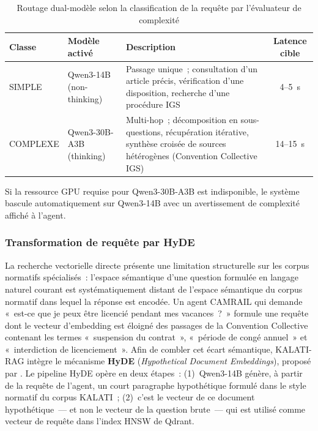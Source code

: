 \documentclass[12pt,a4paper]{report}
\begin{document}
\begin{table}[p]
\centering
\caption{Routage dual-modèle selon la classification de la requête par l'évaluateur de complexité}
\label{tab:routage}
\renewcommand{\arraystretch}{1.4}
\begin{tabularx}{\linewidth}{@{} l l X c @{}}
\toprule
\textbf{Classe} & \textbf{Modèle activé} & \textbf{Description} & \textbf{Latence cible} \\
\midrule
SIMPLE & Qwen3-14B \newline (non-thinking) &
Passage unique~; consultation d'un article précis, vérification d'une disposition,
recherche d'une procédure IGS &
4--5~s \\
\addlinespace
COMPLEXE & Qwen3-30B-A3B \newline (thinking) &
Multi-hop~; décomposition en sous-questions, récupération itérative, synthèse croisée de
sources hétérogènes (Convention Collective \texttimes{} IGS) &
14--15~s \\
\bottomrule
\end{tabularx}
\end{table}

Si la ressource GPU requise pour Qwen3-30B-A3B est indisponible, le système bascule
automatiquement sur Qwen3-14B avec un avertissement de complexité affiché à l'agent.

\subsubsection*{Transformation de requête par HyDE}

La recherche vectorielle directe présente une limitation structurelle sur les corpus normatifs
spécialisés~: l'espace sémantique d'une question formulée en langage naturel courant est
systématiquement distant de l'espace sémantique du corpus normatif dans lequel la réponse est
encodée. Un agent CAMRAIL qui demande «~est-ce que je peux être licencié pendant mes vacances~?~»
formule une requête dont le vecteur d'embedding est éloigné des passages de la Convention
Collective contenant les termes «~suspension du contrat~», «~période de congé annuel~» et
«~interdiction de licenciement~». Afin de combler cet écart sémantique, KALATI-RAG intègre
le mécanisme \textbf{HyDE} (\textit{Hypothetical Document Embeddings}), proposé par
\textcite{Gao2022}. Le pipeline HyDE opère en deux étapes~: (1)~Qwen3-14B génère, à partir de
la requête de l'agent, un court paragraphe hypothétique formulé dans le style normatif du corpus
KALATI~; (2)~c'est le vecteur de ce document hypothétique~--- et non le vecteur de la question
brute~--- qui est utilisé comme vecteur de requête dans l'index HNSW de Qdrant.
\end{document}
